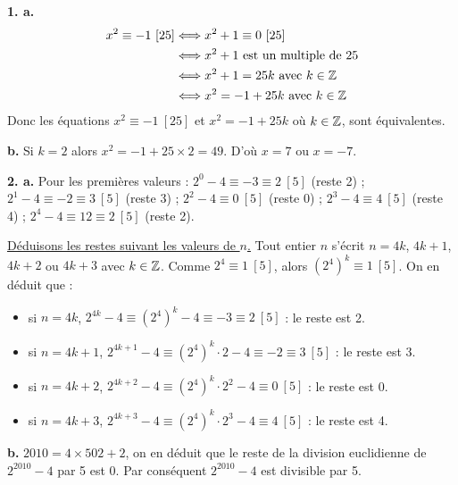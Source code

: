 \documentclass[11pt]{article}
\begin{document}


\textbf{1. a.}
\begin{align*}
x^2 \equiv -1\ [25] &\Longleftrightarrow x^2 + 1 \equiv 0\ [25] \\
&\Longleftrightarrow x^2 + 1 \text{ est un multiple de } 25 \\
&\Longleftrightarrow x^2 + 1 = 25k \text{ avec } k \in \mathbb{Z} \\
&\Longleftrightarrow x^2 = -1 + 25k \text{ avec } k \in \mathbb{Z}
\end{align*}
Donc les équations $x^2 \equiv -1\ [25]$ et $x^2 = -1 + 25k$ où $k \in \mathbb{Z}$, sont équivalentes.

\textbf{b.} Si $k = 2$ alors $x^2 = -1 + 25 \times 2 = 49$. D'où $x = 7$ ou $x = -7$.

\textbf{2. a.} Pour les premières valeurs : $2^0 - 4 \equiv -3 \equiv 2\ [5]$ (reste 2) ; $2^1 - 4 \equiv -2 \equiv 3\ [5]$ (reste 3) ; $2^2 - 4 \equiv 0\ [5]$ (reste 0) ; $2^3 - 4 \equiv 4\ [5]$ (reste 4) ; $2^4 - 4 \equiv 12 \equiv 2\ [5]$ (reste 2).

\underline{Déduisons les restes suivant les valeurs de $n$.} Tout entier $n$ s'écrit $n = 4k$, $4k+1$, $4k+2$ ou $4k+3$ avec $k \in \mathbb{Z}$. Comme $2^4 \equiv 1\ [5]$, alors $(2^4)^k \equiv 1\ [5]$. On en déduit que :
\begin{itemize}
  \item si $n = 4k$, $2^{4k} - 4 \equiv (2^4)^k - 4 \equiv -3 \equiv 2\ [5]$ : le reste est 2.
  \item si $n = 4k+1$, $2^{4k+1} - 4 \equiv (2^4)^k \cdot 2 - 4 \equiv -2 \equiv 3\ [5]$ : le reste est 3.
  \item si $n = 4k+2$, $2^{4k+2} - 4 \equiv (2^4)^k \cdot 2^2 - 4 \equiv 0\ [5]$ : le reste est 0.
  \item si $n = 4k+3$, $2^{4k+3} - 4 \equiv (2^4)^k \cdot 2^3 - 4 \equiv 4\ [5]$ : le reste est 4.
\end{itemize}

\textbf{b.} $2010 = 4 \times 502 + 2$, on en déduit que le reste de la division euclidienne de $2^{2010} - 4$ par 5 est 0. Par conséquent $2^{2010} - 4$ est divisible par 5.

\end{document}
